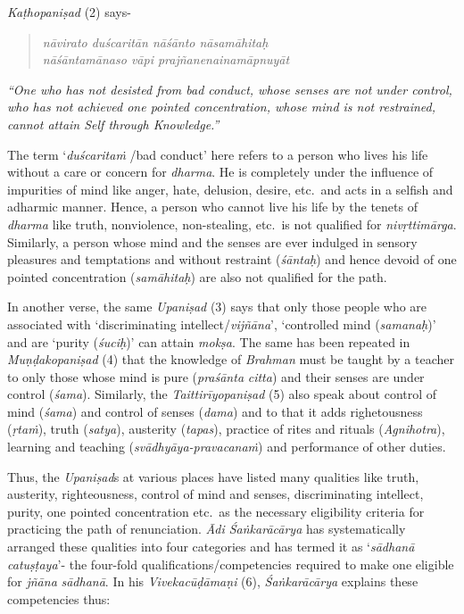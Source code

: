 \emph{Kaṭhopaniṣad} (2) says-

\begin{verse}
\emph{nāvirato duścaritān nāśānto nāsamāhitaḥ }\\
\emph{nāśāntamānaso vāpi prajñanenainamāpnuyāt  }
\end{verse}

\emph{``One who has not desisted from bad conduct, whose senses are not under control, who has not achieved one pointed concentration, whose mind is not restrained, cannot attain Self through Knowledge.''}

The term `\emph{duścaritaṁ} /bad conduct' here refers to a person who lives his life without a care or concern for \emph{dharma}. He is completely under the influence of impurities of mind like anger, hate, delusion, desire, etc.\ and acts in a selfish and adharmic manner. Hence, a person who cannot live his life by the tenets of \emph{dharma} like truth, nonviolence, non-stealing, etc.\ is not qualified for \emph{nivṛttimārga}. Similarly, a person whose mind and the senses are ever indulged in sensory pleasures and temptations and without restraint (\emph{śāntaḥ}) and hence devoid of one pointed concentration (\emph{samāhitaḥ}) are also not qualified for the path.

In another verse, the same \emph{Upaniṣad} (3) says that only those people who are associated with `discriminating intellect/\emph{vijñāna}', `controlled mind (\emph{samanaḥ})' and are `purity (\emph{śuciḥ})' can attain \emph{mokṣa}. The same has been repeated in \emph{Muṇḍakopaniṣad} (4) that the knowledge of \emph{Brahman} must be taught by a teacher to only those whose mind is pure (\emph{praśānta} \emph{citta}) and their senses are under control (\emph{śama}). Similarly, the \emph{Taittirīyopaniṣad} (5) also speak about control of mind (\emph{śama}) and control of senses (\emph{dama}) and to that it adds righetousness (\emph{ṛtaṁ}), truth (\emph{satya}), austerity (\emph{tapas}), practice of rites and rituals (\emph{Agnihotra}), learning and teaching (\emph{svādhyāya-pravacanaṁ}) and performance of other duties.

Thus, the \emph{Upaniṣad}s at various places have listed many qualities like truth, austerity, righteousness, control of mind and senses, discriminating intellect, purity, one pointed concentration etc.\ as the necessary eligibility criteria for practicing the path of renunciation. \emph{Ādi Śaṅkarācārya} has systematically arranged these qualities into four categories and has termed it as `\emph{sādhanā} \emph{catuṣṭaya}'- the four-fold qualifications/competencies required to make one eligible for \emph{jñāna} \emph{sādhanā}. In his \emph{Vivekacūḍāmaṇi} (6), \emph{Śaṅkarācārya} explains these competencies thus:

